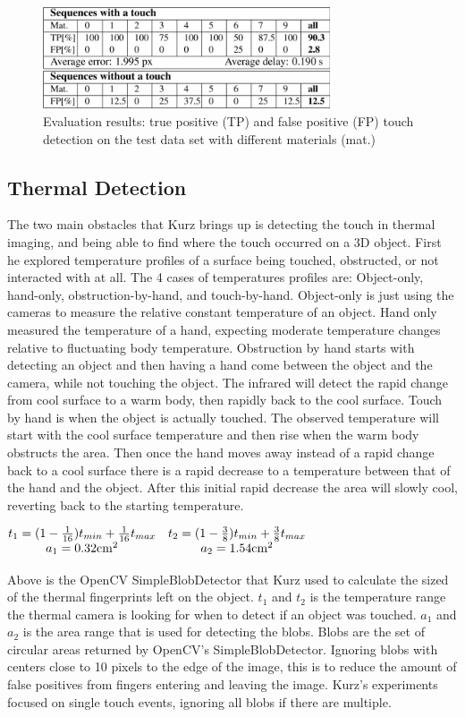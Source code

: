 \documentclass{sig-alternate}
\begin{document}
\begin{figure}
	\includegraphics[width=8.5cm, height=3cm]{TouchData}
	\caption{Evaluation results: true positive (TP) and false positive (FP) touch detection on the test data set with different materials (mat.) \cite{Thermal}}
	\label{fig:TouchData}
\end{figure}


\subsection{Thermal Detection}
\label{Thermal Detection}
The two main obstacles that Kurz brings up is detecting the touch in thermal imaging, and being able to find where the touch occurred on a 3D object. First he explored temperature profiles of a surface being touched, obstructed, or not interacted with at all. The 4 cases of temperatures profiles are: Object-only, hand-only, obstruction-by-hand, and touch-by-hand. Object-only is just using the cameras to measure the relative constant temperature of an object. Hand only measured the temperature of a hand, expecting moderate temperature changes relative to fluctuating body temperature. Obstruction by hand starts with detecting an object and then having a hand come between the object and the camera, while not touching the object. The infrared will detect the rapid change from cool surface to a warm body, then rapidly back to the cool surface. Touch by hand is when the object is actually touched. The observed temperature  will start with the cool surface temperature and then rise when the warm body obstructs the area. Then once the hand moves away instead of a rapid change back to a cool surface there is a rapid decrease to a temperature between that of the hand and the object. After this initial rapid decrease the area will slowly cool, reverting back to the starting temperature. 
 
\(
\begin{matrix}
 t_{1}=(1-{1\over 16})t_{ min}+{1\over 16}t_{ max} & t_{2}=(1-{3\over 8})t_{ min}+{3\over 8}t_{ max}\cr a_{1}=0.32{\rm cm}^{2} & a_{2}=1.54{\rm cm}^{2}
 \end{matrix}
\)

Above is the OpenCV SimpleBlobDetector that Kurz used to calculate the sized of the thermal fingerprints left on the object. \(t_1\) and \(t_2\) is the temperature range the thermal camera is looking for when to detect if an object was touched. \(a_1\) and \(a_2\) is the area range that is used for detecting the blobs. Blobs are the set of circular areas returned by OpenCV's SimpleBlobDetector. Ignoring blobs with centers close to 10 pixels to the edge of the image, this is to reduce the amount of false positives from fingers entering and leaving the image. Kurz's experiments focused on single touch events, ignoring all blobs if there are multiple.        
\end{document}
